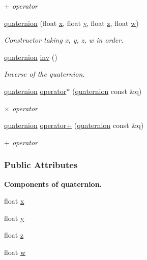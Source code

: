 \begin{DoxyCompactItemize}
\begin{DoxyCompactList}\small\item\em $+$ operator \end{DoxyCompactList}\item 
\hyperlink{classquaternion_a7939abaec2de1b11ff2208cbd8fbd93e}{quaternion} (float \hyperlink{classquaternion_acdcda48f9dd7ff35873aae38fa33ab78}{x}, float \hyperlink{classquaternion_a48e3d1fbf5e12eb54985c32b45dd8303}{y}, float \hyperlink{classquaternion_a538598007238d399f79ddcecd39ef5cf}{z}, float \hyperlink{classquaternion_ab2b38aca1971114e0ba4218b75d7f472}{w})
\begin{DoxyCompactList}\small\item\em Constructor taking x, y, z, w in order. \end{DoxyCompactList}\item 
\hyperlink{classquaternion}{quaternion} \hyperlink{classquaternion_a52cd9cd03bc2613e56dd798cb1037a51}{inv} ()
\begin{DoxyCompactList}\small\item\em Inverse of the quaternion. \end{DoxyCompactList}\item 
\hyperlink{classquaternion}{quaternion} \hyperlink{classquaternion_a444a0e12b77a4388d496de9210117786}{operator$\ast$} (\hyperlink{classquaternion}{quaternion} const \&q)
\begin{DoxyCompactList}\small\item\em $\times$ operator \end{DoxyCompactList}\item 
\hyperlink{classquaternion}{quaternion} \hyperlink{classquaternion_a5def90b88f02a02961ff51d6cd3e7dae}{operator+} (\hyperlink{classquaternion}{quaternion} const \&q)
\begin{DoxyCompactList}\small\item\em $+$ operator \end{DoxyCompactList}\end{DoxyCompactItemize}
\subsubsection*{Public Attributes}
\begin{Indent}{\bf Components of quaternion.}\par
\begin{DoxyCompactItemize}
\item 
float \hyperlink{classquaternion_acdcda48f9dd7ff35873aae38fa33ab78}{x}
\item 
float \hyperlink{classquaternion_a48e3d1fbf5e12eb54985c32b45dd8303}{y}
\item 
float \hyperlink{classquaternion_a538598007238d399f79ddcecd39ef5cf}{z}
\item 
float \hyperlink{classquaternion_ab2b38aca1971114e0ba4218b75d7f472}{w}
\end{DoxyCompactItemize}
\end{Indent}


